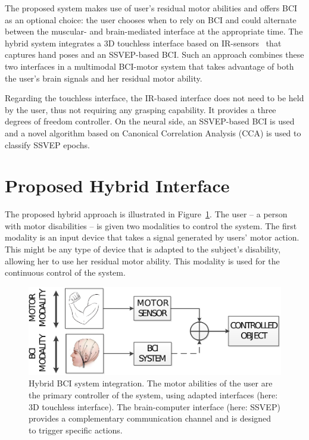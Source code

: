 The proposed system makes use of user's residual motor abilities and offers BCI as an optional choice: the user chooses when to rely on BCI and could alternate between the muscular- and brain-mediated interface at the appropriate time. %
The hybrid system integrates a 3D touchless interface based on IR-sensors~\citep{martin_fast_2012} that captures hand poses %
and an SSVEP-based BCI. 
Such an approach combines these two interfaces in a multimodal BCI-motor system that takes advantage of both the user's brain signals and her residual motor ability. %

Regarding the touchless interface, the IR-based interface does not need to be held by the user, thus not requiring any grasping capability. 
It provides a three degrees of freedom controller. 
On the neural side, an SSVEP-based BCI is used and a novel algorithm based on Canonical Correlation Analysis (CCA) is used to classify SSVEP epochs.

\section{Proposed Hybrid Interface}

The proposed hybrid approach is illustrated in Figure~\ref{fig:hBCI}.
The user -- a person with motor disabilities -- is given two modalities to control the system. 
The first modality is an input device that takes a signal generated by users' motor action. 
This might be any type of device that is adapted to the subject's disability, allowing her to use her residual motor ability. 
This modality is used for the continuous control of the system. 

\begin{figure}[!ht]
    \centering
    \includegraphics[width=0.8\columnwidth]{Figures/hBCI2.pdf}
    \caption{Hybrid BCI system integration. The motor abilities of the user are the primary controller of the system, using adapted interfaces (here: 3D touchless interface). The brain-computer interface (here: SSVEP) provides a complementary communication channel and is designed to trigger specific actions.}
    \label{fig:hBCI}
\end{figure}

